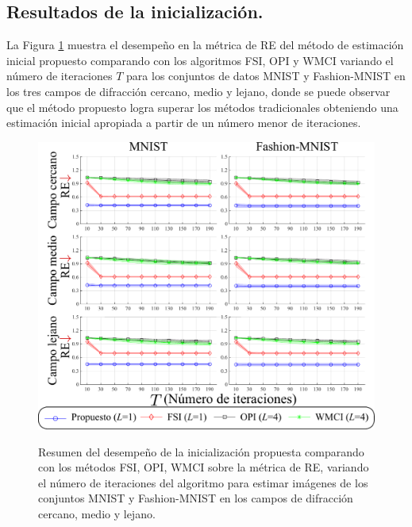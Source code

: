 \begin{table}[!h]
\centering
\caption{ Parámetros de propagación usados para simular el modelo de propagación \eqref{eq:phase_retrieval_problem} para cada campo de difracción.}
\label{tab:parameters}
\end{table}


\subsection{Resultados de la inicialización.}


La Figura \ref{fig:results_initializations} muestra el desempeño en la métrica de RE del método de estimación inicial propuesto comparando con los algoritmos FSI, OPI y WMCI variando el número de iteraciones $T$ para los conjuntos de datos MNIST y Fashion-MNIST en los tres campos de difracción cercano, medio y lejano, donde se puede observar que el método propuesto logra superar los métodos tradicionales obteniendo una estimación inicial apropiada a partir de un número menor de iteraciones.

\begin{figure}[!h]
\centering
    \caption{Resumen del desempeño de la inicialización propuesta comparando con los métodos FSI, OPI, WMCI sobre la métrica de RE, variando el número de iteraciones del algoritmo para estimar imágenes de los conjuntos MNIST y Fashion-MNIST en los campos de difracción cercano, medio y lejano.}
    \includegraphics[width=0.85\linewidth]{images/resultados/results_initializations.pdf}
        \label{fig:results_initializations}
\end{figure}



